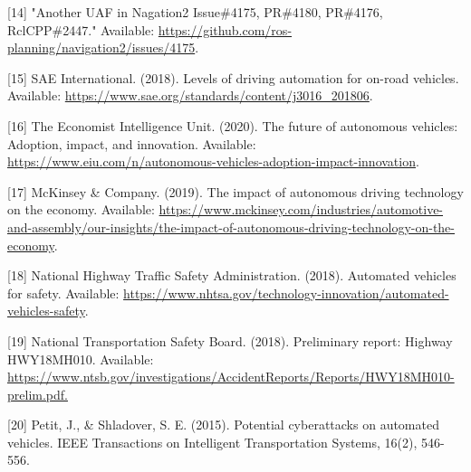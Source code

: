 \documentclass[zihao=-4]{ctexart}
\begin{document}
[14] "Another UAF in Nagation2 Issue\#4175, PR\#4180, PR\#4176, RclCPP\#2447." Available: \url{https://github.com/ros-planning/navigation2/issues/4175}.

[15] SAE International. (2018). Levels of driving automation for on-road vehicles. Available: \url{https://www.sae.org/standards/content/j3016\_201806}.

[16] The Economist Intelligence Unit. (2020). The future of autonomous vehicles: Adoption, impact, and innovation. Available: \url{https://www.eiu.com/n/autonomous-vehicles-adoption-impact-innovation}.

[17] McKinsey \& Company. (2019). The impact of autonomous driving technology on the economy. Available: \url{https://www.mckinsey.com/industries/automotive-and-assembly/our-insights/the-impact-of-autonomous-driving-technology-on-the-economy}.

[18] National Highway Traffic Safety Administration. (2018). Automated vehicles for safety. Available: \url{https://www.nhtsa.gov/technology-innovation/automated-vehicles-safety}.

[19] National Transportation Safety Board. (2018). Preliminary report: Highway HWY18MH010. Available: \url{https://www.ntsb.gov/investigations/AccidentReports/Reports/HWY18MH010-prelim.pdf.}

[20] Petit, J., \& Shladover, S. E. (2015). Potential cyberattacks on automated vehicles. IEEE Transactions on Intelligent Transportation Systems, 16(2), 546-556. 

% 
\end{document}
